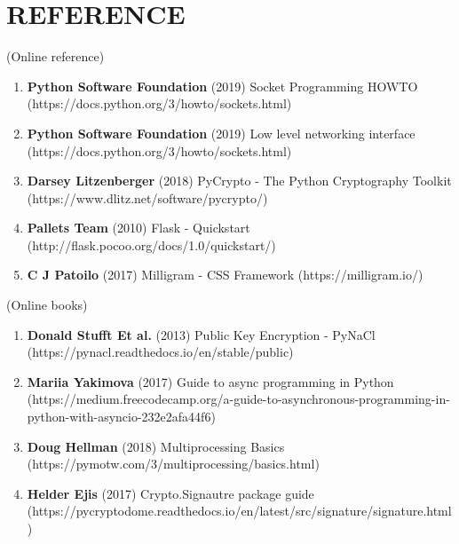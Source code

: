 \chapter*{\rm \large \bf REFERENCE}
\vspace{4.0mm}
\setlength{\parindent}{1cm} 

\scriptsize{(Online reference)}
\begin{enumerate}
    \item \textbf{Python Software Foundation} (2019) Socket Programming HOWTO
        (https://docs.python.org/3/howto/sockets.html)

    \item \textbf{Python Software Foundation} (2019) Low level networking
        interface (https://docs.python.org/3/howto/sockets.html)

    \item \textbf{Darsey Litzenberger} (2018) PyCrypto - The Python Cryptography
        Toolkit (https://www.dlitz.net/software/pycrypto/)

    \item \textbf{Pallets Team} (2010) Flask - Quickstart
        (http://flask.pocoo.org/docs/1.0/quickstart/)

    \item \textbf{C J Patoilo} (2017) Milligram - CSS Framework
        (https://milligram.io/)
\end{enumerate}

\scriptsize{(Online books)}
\begin{enumerate}
    \item \textbf{Donald Stufft Et al.} (2013) Public Key Encryption - PyNaCl
        (https://pynacl.readthedocs.io/en/stable/public)

    \item \textbf{Mariia Yakimova} (2017) Guide to async programming in Python
        (https://medium.freecodecamp.org/a-guide-to-asynchronous-programming-in-python-with-asyncio-232e2afa44f6)

    \item \textbf{Doug Hellman} (2018) Multiprocessing Basics
        (https://pymotw.com/3/multiprocessing/basics.html)

    \item \textbf{Helder Ejis} (2017) Crypto.Signautre package guide
        (https://pycryptodome.readthedocs.io/en/latest/src/signature/signature.html)
\end{enumerate}

\newpage
